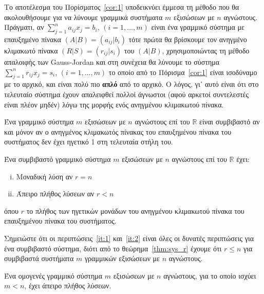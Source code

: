 \begin{rem}
  Το αποτέλεσμα του Πορίσματος~\ref{cor:1} υποδεικνύει έμμεσα τη μέθοδο που θα 
  ακολουθήσουμε για να λύνουμε γραμμικά συστήματα $m$ εξισώσεων με $ n $ αγνώστους. 
  Πράγματι, αν $ \sum_{j=1}^{n} a_{ij}x_{j} = b_{i}  $, $ (i=1,\ldots,m) $ είναι ένα 
  γραμμικό σύστημα με επαυξημένο πίνακα $ (A|B)=(a_{ij}|b_{i}) $ τότε πρώτα θα βρίσκουμε 
  τον ανηγμένο κλιμακωτό πίνακα $ (R|S)=(r_{ij}|s_{i}) $ του $ (A|B) $, χρησιμοποιώντας 
  τη μέθοδο απαλοιφής των Gauss-Jordan και στη συνέχεια θα λύνουμε το σύστημα 
  $ \sum_{j=1}^{n} r_{ij}x_{j}=s_{i}  $, $ (i=1,\ldots,m) $ το οποίο από το
  Πόρισμα~\ref{cor:1} είναι ισοδύναμο με το αρχικό, και είναι πολύ πιο \textbf{απλό} 
  από το αρχικό. Ο λόγος, γι᾽ αυτό είναι ότι στο τελευταίο σύστημα έχουν απαλειφθεί 
  πολλοί άγνωστοι (αφού αρκετοί συντελεστές είναι πλέον μηδέν) λόγω της μορφής 
  ενός ανηγμένου κλιμακωτού πίνακα.
\end{rem}

\begin{thm}\label{thm:sys_r}
  Ένα γραμμικό σύστημα $ m $ εξισώσεων με $n$ αγνώστους επί  του $ \mathbb{R} $ είναι 
  συμβιβαστό αν και μόνον αν ο ανηγμένος κλιμακωτός πίνακας του επαυξημένου πίνακα του 
  συστήματος δεν έχει ηγετικό 1 στη τελευταία στήλη του.
\end{thm}

\begin{cor}
  Ένα συμβιβαστό γραμμικό σύστημα $m$ εξισώσεων με $n$ αγνώστους επί του $ \mathbb{R} $ 
  έχει: 
  \begin{enumerate}[i)]
    \item \label{it:1} Μοναδική λύση αν $ r=n $
    \item \label{it:2} Άπειρο πλήθος λύσεων αν $ r<n $
  \end{enumerate}
  όπου $r$ το πλήθος των ηγετικών μονάδων του ανηγμένου κλιμακωτού πίνακα του 
  επαυξημένου πίνακα του συστήματος.
\end{cor}

\begin{rem}
  Σημειώστε ότι οι περιπτώσεις~\ref{it:1} και~\ref{it:2} είναι όλες οι δυνατές 
  περιπτώσεις για ένα συμβιβαστό σύστημα, διότι από το θεώρημα~\ref{thm:sys_r} 
  έχουμε ότι $ r \leq n $ για συμβιβαστά συστήματα $m$ γραμμικών εξισώσεων με $n$ 
  αγνώστους.
\end{rem}

\begin{cor}
  Ένα ομογενές γραμμικό σύστημα $m$ εξισώσεων με $n$ αγνώστους, για το οποίο ισχύει
  $ m < n $, έχει άπειρο πλήθος λύσεων.
\end{cor}


